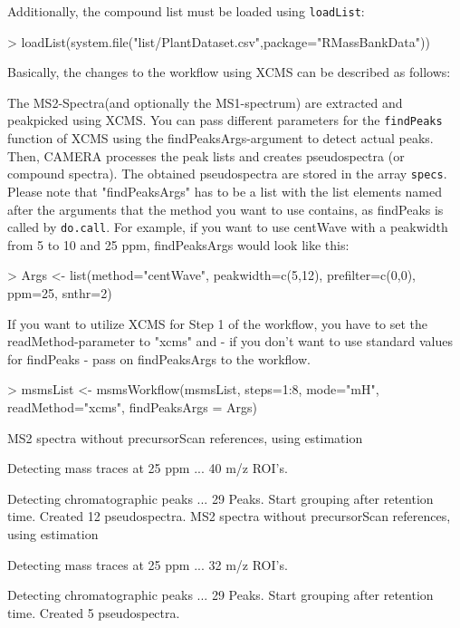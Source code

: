 \documentclass[letterpaper, 11pt]{article}
\newcommand{\Rfunction}[1]{{\texttt{#1}}}
\newcommand{\Rvar}[1]{{\texttt{#1}}}
\begin{document}
Additionally, the compound list must be loaded using \Rfunction{loadList}:

\begin{Schunk}
\begin{Sinput}
> loadList(system.file("list/PlantDataset.csv",package="RMassBankData"))
\end{Sinput}
\end{Schunk}

Basically, the changes to the workflow using XCMS can be described as follows:

The MS2-Spectra(and optionally the MS1-spectrum) are extracted and peakpicked using XCMS. You can pass different parameters for the \Rfunction{findPeaks} function of XCMS using the findPeaksArgs-argument to detect actual peaks. Then, CAMERA processes the peak lists and creates pseudospectra (or compound spectra). The obtained pseudospectra are stored in the array \Rvar{specs}.
Please note that "findPeaksArgs" has to be a list with the list elements named after the arguments that the method you want to use contains, as findPeaks is called by \Rfunction{do.call}.
For example, if you want to use centWave with a peakwidth from 5 to 10 and 25 ppm, findPeaksArgs would look like this:

\begin{Schunk}
\begin{Sinput}
> 	Args <- list(method="centWave", peakwidth=c(5,12), prefilter=c(0,0), ppm=25, snthr=2)
\end{Sinput}
\end{Schunk}

If you want to utilize XCMS for Step 1 of the workflow, you have to set the readMethod-parameter to "xcms" and - if you don't want to use standard values for findPeaks - pass on findPeaksArgs to the workflow.

\begin{Schunk}
\begin{Sinput}
> 	msmsList <- msmsWorkflow(msmsList, steps=1:8, mode="mH", readMethod="xcms", findPeaksArgs = Args)
\end{Sinput}
\begin{Soutput}
MS2 spectra without precursorScan references, using estimation

 Detecting mass traces at 25 ppm ... 
 % finished: 10 20 30 40 50 60 70 80 90 100 
 40 m/z ROI's.

 Detecting chromatographic peaks ... 
 % finished: 10 20 30 40 50 60 70 80 90 100 
 29  Peaks.
Start grouping after retention time.
Created 12 pseudospectra.
MS2 spectra without precursorScan references, using estimation

 Detecting mass traces at 25 ppm ... 
 % finished: 10 20 30 40 50 60 70 80 90 100 
 32 m/z ROI's.

 Detecting chromatographic peaks ... 
 % finished: 50 100 
 29  Peaks.
Start grouping after retention time.
Created 5 pseudospectra.
\end{Soutput}
\end{Schunk}
\end{document}
